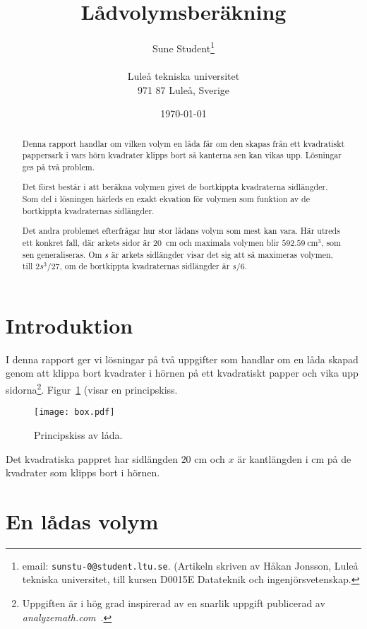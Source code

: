 \documentclass[a4paper,12pt]{article}
\title{Lådvolymsberäkning}
\author{Sune Student\thanks{email:
        \texttt{sunstu-0@student.ltu.se}. (Artikeln skriven av Håkan
        Jonsson, Luleå tekniska universitet, till kursen D0015E
        Datateknik och ingenjörsvetenskap.} \\
        ~ \\
        Luleå tekniska universitet \\
        971 87 Luleå, Sverige}
\date{\today}
\begin{document}
\linenumbers %
\maketitle


\begin{abstract}
  Denna rapport handlar om vilken volym en låda får om den skapas från
  ett kvadratiskt pappersark i vars hörn kvadrater klipps bort så
  kanterna sen kan vikas upp. Lösningar ges på två problem.

  
  Det först består i att beräkna volymen givet de bortkippta
  kvadraterna sidlängder. Som del i lösningen härleds en exakt
  ekvation för volymen som funktion av de bortkippta kvadraternas
  sidlängder. 

  
  Det andra problemet efterfrågar hur stor lådans volym som mest kan
  vara. Här utreds ett konkret fall, där arkets sidor är $20$~cm
  och maximala volymen blir $592.59~\text{cm}^3$, som sen
  generaliseras. Om $s$ är arkets sidlängder visar det sig att så
  maximeras volymen, till $2s^3/27$, om de bortkippta kvadraternas
  sidlängder är $s/6$. 
\end{abstract}


\section{Introduktion}


I denna rapport ger vi lösningar på två uppgifter som handlar om en
låda skapad genom att klippa bort kvadrater i hörnen på ett kvadratiskt
papper och vika upp sidorna\footnote{Uppgiften är i hög grad
inspirerad av en snarlik uppgift publicerad av
\emph{analyzemath.com}~\cite{webbsida}.}. Figur~\ref{fig:box} (visar en
principskiss. 
%
\begin{figure}[tbh]
  \centering
  \texttt{[image: box.pdf]}
  \caption{Principskiss av låda.} 
  \label{fig:box}
\end{figure}
%
Det kvadratiska pappret har sidlängden $20$ cm och $x$ är kantlängden i
cm på de kvadrater som klipps bort i hörnen. 


\section{En lådas volym}
\label{sec:v}
\end{document}
